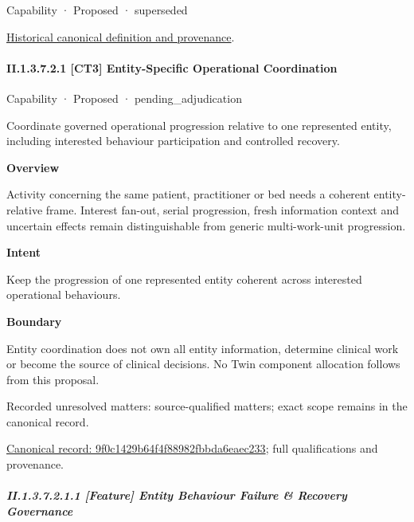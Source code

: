 \label{element:ca96b2b2ff434854995711e403e95f6f}
{\small Capability · Proposed · superseded}\par
\href{../../../../continuum/strategy/capability/ca96b2b2ff434854995711e403e95f6f.md}{Historical canonical definition and provenance}.\par
\paragraph*{II.1.3.7.2.1 [CT3] Entity-Specific Operational Coordination}
\label{navigation:II.1.3.7.2.1}

\label{element:9f0c1429b64f4f88982fbbda6eaec233}
{\small Capability · Proposed · pending\_adjudication}\par

Coordinate governed operational progression relative to one represented entity, including interested behaviour participation and controlled recovery.



\textbf{Overview}



Activity concerning the same patient, practitioner or bed needs a coherent entity-relative frame. Interest fan-out, serial progression, fresh information context and uncertain effects remain distinguishable from generic multi-work-unit progression.



\textbf{Intent}



Keep the progression of one represented entity coherent across interested operational behaviours.



\textbf{Boundary}



Entity coordination does not own all entity information, determine clinical work or become the source of clinical decisions. No Twin component allocation follows from this proposal.


{\small Recorded unresolved matters: source-qualified matters; exact scope remains in the canonical record.}\par
{\footnotesize \href{../../../../continuum/strategy/capability/9f0c1429b64f4f88982fbbda6eaec233.md}{Canonical record: 9f0c1429b64f4f88982fbbda6eaec233}; full qualifications and provenance.}\par
\subparagraph*{II.1.3.7.2.1.1 [Feature] Entity Behaviour Failure \& Recovery Governance}
\label{navigation:II.1.3.7.2.1.1}

